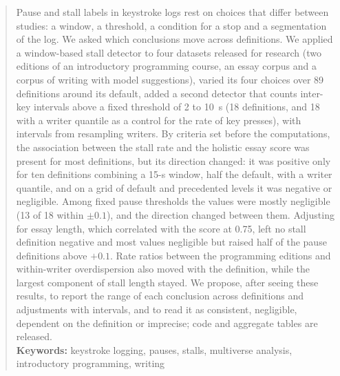 \begin{abstract}
Pause and stall labels in keystroke logs rest on choices that differ between studies: a window, a threshold, a
condition for a stop and a segmentation of the log. We asked which conclusions
move across definitions. We applied a window-based stall detector to four datasets released for research (two
editions of an introductory programming course, an essay corpus and a corpus of writing with model suggestions),
varied its four choices over 89 definitions around its default, added a second detector that counts
inter-key intervals above a fixed threshold of 2 to 10~s (18 definitions, and 18 with a writer quantile as a
control for the rate of key presses), with intervals from resampling writers.
By criteria set before the computations, the association between the stall rate and the holistic essay score was
present for most definitions, but its direction changed: it was positive only for ten definitions combining a 15-s
window, half the default, with a writer quantile, and on a grid of default and precedented levels it was negative or
negligible. Among fixed pause thresholds the values were mostly negligible (13 of 18 within $\pm 0.1$), and the
direction changed between them. Adjusting for essay length, which correlated with the score at 0.75, left no stall
definition negative and most values negligible but raised half of the pause definitions above $+0.1$. Rate ratios
between the programming editions and within-writer overdispersion also moved with the definition, while the largest
component of stall length stayed. We propose, after seeing these results, to report the range of each conclusion
across definitions and adjustments with intervals, and to read it as consistent, negligible, dependent on the
definition or imprecise; code and aggregate tables are released.\\

{\parindent0pt
\textbf{Keywords:} keystroke logging, pauses, stalls, multiverse analysis, introductory programming, writing
}
\end{abstract}
